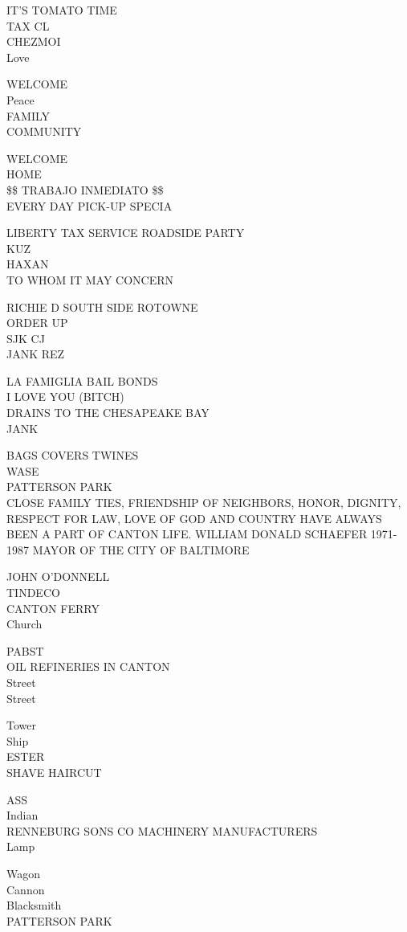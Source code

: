 \documentclass[10pt,letterpaper]{article}
\begin{document}
IT'S TOMATO TIME\\
TAX CL\\
CHEZMOI\\
Love

WELCOME\\
Peace\\
FAMILY\\
COMMUNITY

WELCOME\\
HOME\\
\$\$ TRABAJO INMEDIATO \$\$\\
EVERY DAY PICK{-}UP SPECIA

LIBERTY TAX SERVICE ROADSIDE PARTY\\
KUZ\\
HAXAN\\
TO WHOM IT MAY CONCERN

RICHIE D SOUTH SIDE ROTOWNE\\
ORDER UP\\
SJK CJ\\
JANK REZ

LA FAMIGLIA BAIL BONDS\\
I LOVE YOU (BITCH)\\
DRAINS TO THE CHESAPEAKE BAY\\
JANK

BAGS COVERS TWINES\\
WASE\\
PATTERSON PARK\\
CLOSE FAMILY TIES, FRIENDSHIP OF NEIGHBORS, HONOR, DIGNITY, RESPECT FOR LAW, LOVE OF GOD AND COUNTRY HAVE ALWAYS BEEN A PART OF CANTON LIFE.  WILLIAM DONALD SCHAEFER 1971{-}1987 MAYOR OF THE CITY OF BALTIMORE

JOHN O'DONNELL\\
TINDECO\\
CANTON FERRY\\
Church

PABST\\
OIL REFINERIES IN CANTON\\
Street\\
Street

Tower\\
Ship\\
ESTER\\
SHAVE HAIRCUT

ASS\\
Indian\\
RENNEBURG SONS CO MACHINERY MANUFACTURERS\\
Lamp

Wagon\\
Cannon\\
Blacksmith\\
PATTERSON PARK
\end{document}
